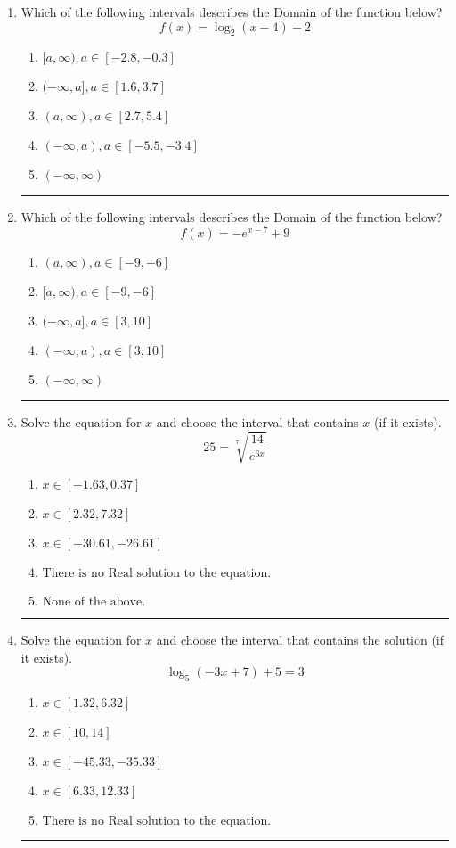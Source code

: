 \documentclass[14pt]{extbook}
\newcommand{\litem}[1]{\item#1\hspace*{-1cm}\rule{\textwidth}{0.4pt}}
\begin{document}
\begin{enumerate}
{\begin{enumerate}[label=\Alph*.]
\end{enumerate} }
\litem{
Which of the following intervals describes the Domain of the function below?\[ f(x) = \log_2{(x-4)}-2 \]\begin{enumerate}[label=\Alph*.]
\item \( [a, \infty), a \in [-2.8, -0.3] \)
\item \( (-\infty, a], a \in [1.6, 3.7] \)
\item \( (a, \infty), a \in [2.7, 5.4] \)
\item \( (-\infty, a), a \in [-5.5, -3.4] \)
\item \( (-\infty, \infty) \)

\end{enumerate} }
\litem{
Which of the following intervals describes the Domain of the function below?\[ f(x) = -e^{x-7}+9 \]\begin{enumerate}[label=\Alph*.]
\item \( (a, \infty), a \in [-9, -6] \)
\item \( [a, \infty), a \in [-9, -6] \)
\item \( (-\infty, a], a \in [3, 10] \)
\item \( (-\infty, a), a \in [3, 10] \)
\item \( (-\infty, \infty) \)

\end{enumerate} }
\litem{
 Solve the equation for $x$ and choose the interval that contains $x$ (if it exists).\[  25 = \sqrt[7]{\frac{14}{e^{6x}}} \]\begin{enumerate}[label=\Alph*.]
\item \( x \in [-1.63, 0.37] \)
\item \( x \in [2.32, 7.32] \)
\item \( x \in [-30.61, -26.61] \)
\item \( \text{There is no Real solution to the equation.} \)
\item \( \text{None of the above.} \)

\end{enumerate} }
\litem{
Solve the equation for $x$ and choose the interval that contains the solution (if it exists).\[ \log_{5}{(-3x+7)}+5 = 3 \]\begin{enumerate}[label=\Alph*.]
\item \( x \in [1.32, 6.32] \)
\item \( x \in [10, 14] \)
\item \( x \in [-45.33, -35.33] \)
\item \( x \in [6.33, 12.33] \)
\item \( \text{There is no Real solution to the equation.} \)


\end{enumerate}}
\end{enumerate}
\end{document}
